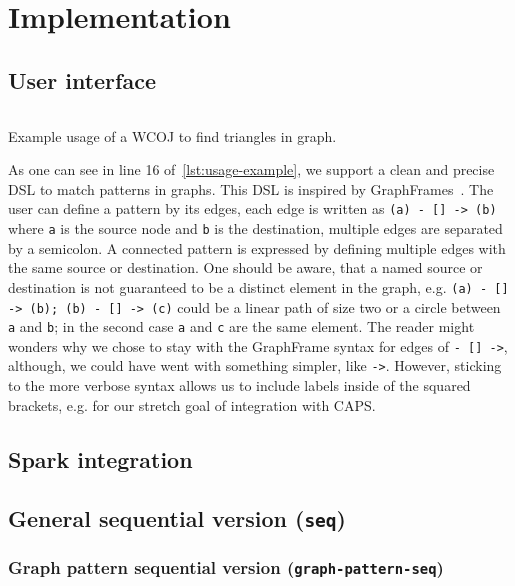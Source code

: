 \section{Implementation}\label{sec:implementation}

\subsection{User interface}\label{subsec:user-interface}
\begin{listing}[H]
    \inputminted{scala}{code/usage-example.scala}
    \caption{Example usage of a WCOJ to find triangles in graph.}
    \label{lst:usage-example}
\end{listing}

As one can see in line 16 %
of~\cref{lst:usage-example}, we support a clean and precise DSL to match patterns in graphs.
This DSL is inspired by GraphFrames~\cite{graph-frames}.
The user can define a pattern by its edges, each edge is written as \texttt{(a) - [] -> (b)} where \texttt{a} is the
source node and \texttt{b} is the destination, multiple edges are separated by a semicolon.
A connected pattern is expressed by defining multiple edges with the same source or destination.
One should be aware, that a named source or destination is not guaranteed to be a distinct element in the graph,
e.g. \texttt{(a) - [] -> (b); (b) - [] -> (c)} could be a linear path of size two or a circle between \texttt{a} and
\texttt{b}; in the second case \texttt{a} and \texttt{c} are the same element.
The reader might wonders why we chose to stay with the GraphFrame syntax for edges of
\texttt{- [] ->}, although, we could have went with something simpler, like \texttt{->}.
However, sticking to the more verbose syntax allows us to include labels inside of the squared brackets, e.g.
for our stretch goal of integration with CAPS.

\subsection{Spark integration}\label{subsec:spark-integration}

\subsection{General sequential version (\texttt{seq})}\label{subsec:general-sequential-versiontexttt}

\subsubsection{Graph pattern sequential version (\texttt{graph-pattern-seq})}
